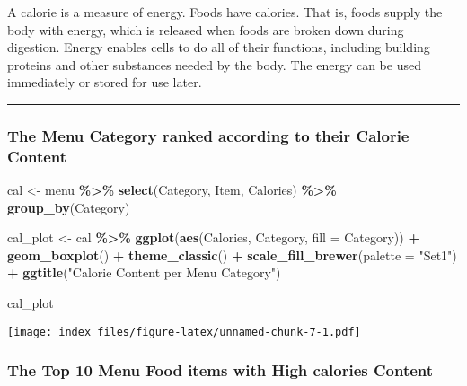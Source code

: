 \documentclass[
]{article}
\newenvironment{Shaded}{\begin{snugshade}}{\end{snugshade}}
\newcommand{\AttributeTok}[1]{\textcolor[rgb]{0.13,0.29,0.53}{#1}}
\newcommand{\FunctionTok}[1]{\textcolor[rgb]{0.13,0.29,0.53}{\textbf{#1}}}
\newcommand{\NormalTok}[1]{#1}
\newcommand{\OtherTok}[1]{\textcolor[rgb]{0.56,0.35,0.01}{#1}}
\newcommand{\SpecialCharTok}[1]{\textcolor[rgb]{0.81,0.36,0.00}{\textbf{#1}}}
\newcommand{\StringTok}[1]{\textcolor[rgb]{0.31,0.60,0.02}{#1}}
\begin{document}
A calorie is a measure of energy. Foods have calories. That is, foods
supply the body with energy, which is released when foods are broken
down during digestion. Energy enables cells to do all of their
functions, including building proteins and other substances needed by
the body. The energy can be used immediately or stored for use later.

\begin{center}\rule{0.5\linewidth}{0.5pt}\end{center}

\hypertarget{the-menu-category-ranked-according-to-their-calorie-content}{%
\subsubsection{The Menu Category ranked according to their Calorie
Content}\label{the-menu-category-ranked-according-to-their-calorie-content}}

\begin{Shaded}
\begin{Highlighting}[]
\NormalTok{cal }\OtherTok{\textless{}{-}}\NormalTok{ menu }\SpecialCharTok{\%\textgreater{}\%} 
  \FunctionTok{select}\NormalTok{(Category,}
\NormalTok{         Item,}
\NormalTok{         Calories) }\SpecialCharTok{\%\textgreater{}\%} 
  \FunctionTok{group\_by}\NormalTok{(Category)  }



\NormalTok{cal\_plot }\OtherTok{\textless{}{-}}\NormalTok{ cal }\SpecialCharTok{\%\textgreater{}\%} 
  \FunctionTok{ggplot}\NormalTok{(}\FunctionTok{aes}\NormalTok{(Calories,}
\NormalTok{             Category,}
             \AttributeTok{fill =}\NormalTok{ Category)) }\SpecialCharTok{+} 
  \FunctionTok{geom\_boxplot}\NormalTok{() }\SpecialCharTok{+} 
  \FunctionTok{theme\_classic}\NormalTok{() }\SpecialCharTok{+} 
  \FunctionTok{scale\_fill\_brewer}\NormalTok{(}\AttributeTok{palette =} \StringTok{"Set1"}\NormalTok{) }\SpecialCharTok{+} \FunctionTok{ggtitle}\NormalTok{(}\StringTok{"Calorie Content per Menu Category"}\NormalTok{)}

\NormalTok{cal\_plot}
\end{Highlighting}
\end{Shaded}

\texttt{[image: index\_files/figure-latex/unnamed-chunk-7-1.pdf]}

\hypertarget{the-top-10-menu-food-items-with-high-calories-content}{%
\subsubsection{The Top 10 Menu Food items with High calories
Content}\label{the-top-10-menu-food-items-with-high-calories-content}}
\end{document}
